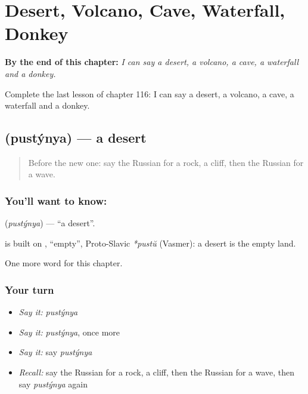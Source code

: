 
\chapter{Desert, Volcano, Cave, Waterfall, Donkey}
\label{ch:ru-desert-volcano-cave-waterfall-donkey}

\begin{chapteropening}
\textbf{By the end of this chapter:} \emph{I can say a desert, a volcano, a cave, a waterfall and a donkey.}

Complete the last lesson of chapter 116: I can say a desert, a volcano, a cave, a waterfall and a donkey.
\end{chapteropening}

\section[\texorpdfstring{\ru{пустыня} (pustýnya)}{пустыня (pustýnya)}]{ (pustýnya) — a desert}

\label{lesson:RU-C116-desert}



\begin{quote}
Before the new one: say the Russian for a rock, a cliff, then the Russian for a wave.
\end{quote}

\subsection*{You'll want to know: }
\textbf{} (\emph{pustýnya}) — \textquotedblleft{}a desert\textquotedblright{}.

\begin{cousinweb}
\textbf{} is built on \emph{}, \textquotedblleft{}empty\textquotedblright{}, Proto-Slavic \emph{*pustŭ} (Vasmer): a desert is the empty land.
\end{cousinweb}

\begin{grammarlens}[title={What you've built}]
One more word for this chapter.
\end{grammarlens}

\subsection*{Your turn}
\begin{itemize}
\raggedright
  \item \emph{Say it:} \emph{pustýnya}
  \item \emph{Say it:} \emph{pustýnya}, once more
  \item \emph{Say it:} say \emph{pustýnya}
  \item \emph{Recall:} say the Russian for a rock, a cliff, then the Russian for a wave, then say \emph{pustýnya} again
\end{itemize}

